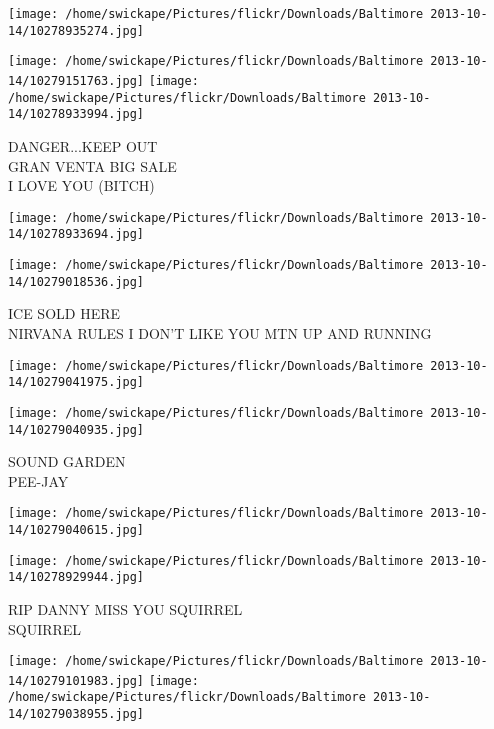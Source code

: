 \documentclass[10pt,letterpaper]{article}
\begin{document}
\texttt{[image: /home/swickape/Pictures/flickr/Downloads/Baltimore 2013-10-14/10278935274.jpg]}

\vspace{0.25in}
\texttt{[image: /home/swickape/Pictures/flickr/Downloads/Baltimore 2013-10-14/10279151763.jpg]}
\texttt{[image: /home/swickape/Pictures/flickr/Downloads/Baltimore 2013-10-14/10278933994.jpg]}

DANGER...KEEP OUT\\
GRAN VENTA BIG SALE\\
I LOVE YOU (BITCH)\\
\pagebreak

\texttt{[image: /home/swickape/Pictures/flickr/Downloads/Baltimore 2013-10-14/10278933694.jpg]}

\vspace{0.25in}
\texttt{[image: /home/swickape/Pictures/flickr/Downloads/Baltimore 2013-10-14/10279018536.jpg]}

ICE SOLD HERE\\
NIRVANA RULES I DON'T LIKE YOU MTN UP AND RUNNING\\
\pagebreak

\texttt{[image: /home/swickape/Pictures/flickr/Downloads/Baltimore 2013-10-14/10279041975.jpg]}

\vspace{0.25in}
\texttt{[image: /home/swickape/Pictures/flickr/Downloads/Baltimore 2013-10-14/10279040935.jpg]}

SOUND GARDEN\\
PEE{-}JAY\\
\pagebreak

\texttt{[image: /home/swickape/Pictures/flickr/Downloads/Baltimore 2013-10-14/10279040615.jpg]}

\vspace{0.25in}
\texttt{[image: /home/swickape/Pictures/flickr/Downloads/Baltimore 2013-10-14/10278929944.jpg]}

RIP DANNY MISS YOU SQUIRREL\\
SQUIRREL\\
\pagebreak

\texttt{[image: /home/swickape/Pictures/flickr/Downloads/Baltimore 2013-10-14/10279101983.jpg]}
\texttt{[image: /home/swickape/Pictures/flickr/Downloads/Baltimore 2013-10-14/10279038955.jpg]}
\end{document}
